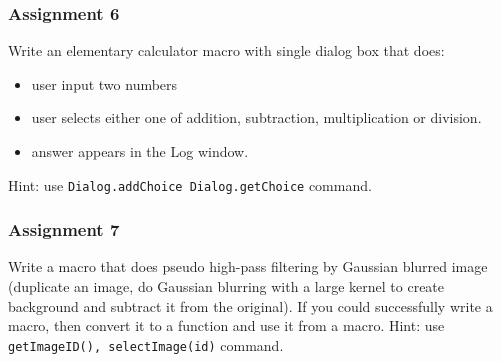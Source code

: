 \documentclass[11pt,a4paper,oneside]{report}
\newcommand{\ilcom}[1]{\texttt{\small#1}}
\begin{document}
\subsubsection{Assignment 6}
Write an elementary calculator macro with single dialog box that does:
\begin{itemize}
\item user input two numbers
\item user selects either one of addition, subtraction, multiplication or division. 
\item answer appears in the Log window. 
 \end{itemize}
Hint: use \ilcom{Dialog.addChoice Dialog.getChoice} command.   

\subsubsection{Assignment 7}
Write a macro that does pseudo high-pass filtering by Gaussian blurred image
(duplicate an image, do Gaussian blurring with a large kernel to create
background and subtract it from the original). If you could successfully write a
macro, then convert it to a function and use it from a macro.
Hint: use \ilcom{getImageID(), selectImage(id)} command.   
\end{document}

